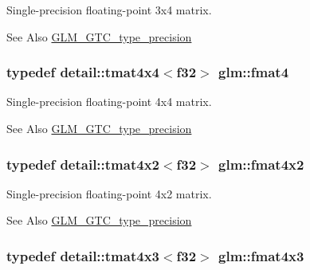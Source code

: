 Single-\/precision floating-\/point 3x4 matrix. 

\begin{DoxySeeAlso}{See Also}
\hyperlink{group__gtc__type__precision}{G\-L\-M\-\_\-\-G\-T\-C\-\_\-type\-\_\-precision} 
\end{DoxySeeAlso}
\hypertarget{group__gtc__type__precision_ga055416da4fe01f31008a03b52a80d174}{
\subsubsection[{fmat4}]{\setlength{\rightskip}{0pt plus 5cm}typedef detail\-::tmat4x4$<$f32$>$ {\bf glm\-::fmat4}}}\label{group__gtc__type__precision_ga055416da4fe01f31008a03b52a80d174}


Single-\/precision floating-\/point 4x4 matrix. 

\begin{DoxySeeAlso}{See Also}
\hyperlink{group__gtc__type__precision}{G\-L\-M\-\_\-\-G\-T\-C\-\_\-type\-\_\-precision} 
\end{DoxySeeAlso}
\hypertarget{group__gtc__type__precision_ga532054b5f4c6f8cadec059d83e188104}{
\subsubsection[{fmat4x2}]{\setlength{\rightskip}{0pt plus 5cm}typedef detail\-::tmat4x2$<$f32$>$ {\bf glm\-::fmat4x2}}}\label{group__gtc__type__precision_ga532054b5f4c6f8cadec059d83e188104}


Single-\/precision floating-\/point 4x2 matrix. 

\begin{DoxySeeAlso}{See Also}
\hyperlink{group__gtc__type__precision}{G\-L\-M\-\_\-\-G\-T\-C\-\_\-type\-\_\-precision} 
\end{DoxySeeAlso}
\hypertarget{group__gtc__type__precision_ga55d2df2d8b1b94d495125530fac1da69}{
\subsubsection[{fmat4x3}]{\setlength{\rightskip}{0pt plus 5cm}typedef detail\-::tmat4x3$<$f32$>$ {\bf glm\-::fmat4x3}}}\label{group__gtc__type__precision_ga55d2df2d8b1b94d495125530fac1da69}


